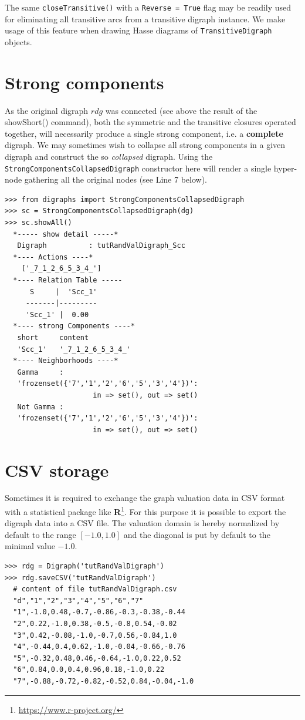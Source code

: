 The same \texttt{closeTransitive()} with a \texttt{Reverse = True} flag may be readily used for eliminating all transitive arcs from a transitive digraph instance. We make usage of this feature when drawing Hasse diagrams of \texttt{TransitiveDigraph} objects.

\section{Strong components}
\label{sec:2.8}

As the original digraph $rdg$ was connected (see above the result of the showShort() command), both the symmetric and the transitive closures operated together, will necessarily produce a single strong component, i.e. a \textbf{complete} digraph. We may sometimes wish to collapse all strong components in a given digraph and construct the so \emph{collapsed} digraph. Using the \texttt{StrongComponentsCollapsedDigraph} constructor  here will render a single hyper-node gathering all the original nodes (see Line 7 below).
\begin{lstlisting}[caption={Computing the strong components in a digraph},label=list:2.10]
>>> from digraphs import StrongComponentsCollapsedDigraph
>>> sc = StrongComponentsCollapsedDigraph(dg)
>>> sc.showAll()
  *----- show detail -----*
   Digraph          : tutRandValDigraph_Scc
  *---- Actions ----*
    ['_7_1_2_6_5_3_4_']
  *---- Relation Table -----
      S     |  'Scc_1'	  
     -------|---------
     'Scc_1' |  0.00
  *---- strong Components ----*
   short 	 content
   'Scc_1' 	 '_7_1_2_6_5_3_4_'
  *---- Neighborhoods ----*
   Gamma     :
   'frozenset({'7','1','2','6','5','3','4'})':
                     in => set(), out => set()
   Not Gamma :
   'frozenset({'7','1','2','6','5','3','4'})':
                     in => set(), out => set()
\end{lstlisting}
  
\section{CSV storage}
\label{sec:2.9}

Sometimes it is required to exchange the graph valuation data in CSV format with a statistical package like \textbf{R}\footnote{\url{https://www.r-project.org/}}. For this purpose it is possible to export the digraph data into a CSV file. The valuation domain is hereby normalized by default to the range $[-1.0,1.0]$ and the diagonal is put by default to the minimal value $-1.0$.
\begin{lstlisting}
>>> rdg = Digraph('tutRandValDigraph')
>>> rdg.saveCSV('tutRandValDigraph')
  # content of file tutRandValDigraph.csv
  "d","1","2","3","4","5","6","7"
  "1",-1.0,0.48,-0.7,-0.86,-0.3,-0.38,-0.44
  "2",0.22,-1.0,0.38,-0.5,-0.8,0.54,-0.02
  "3",0.42,-0.08,-1.0,-0.7,0.56,-0.84,1.0
  "4",-0.44,0.4,0.62,-1.0,-0.04,-0.66,-0.76
  "5",-0.32,0.48,0.46,-0.64,-1.0,0.22,0.52
  "6",0.84,0.0,0.4,0.96,0.18,-1.0,0.22
  "7",-0.88,-0.72,-0.82,-0.52,0.84,-0.04,-1.0
\end{lstlisting}
  
